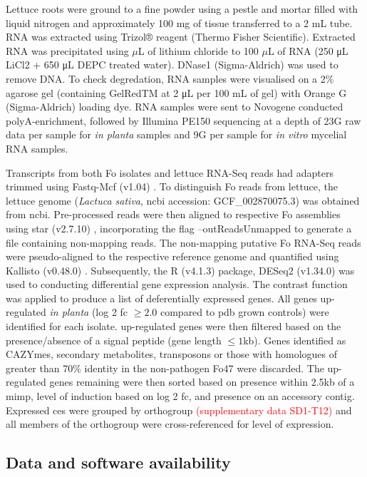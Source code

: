 Lettuce roots were ground to a fine powder using a pestle and mortar filled with liquid nitrogen and approximately 100 mg of tissue transferred to a 2 mL tube. RNA was extracted using Trizol® reagent (Thermo Fisher Scientific). Extracted RNA was precipitated using \(\mu\)L of lithium chloride to 100 \(\mu\)L of RNA (250 μL LiCl2 + 650 μL DEPC treated water). DNase1 (Sigma-Aldrich) was used to remove DNA. To check degredation, RNA samples were visualised on a 2\% agarose gel (containing GelRedTM at 2 μL per 100 mL of gel) with Orange G (Sigma-Aldrich) loading dye. RNA samples were sent to  Novogene conducted polyA-enrichment, followed by Illumina PE150 sequencing at a depth of 23G raw data per sample for \textit{in planta} samples and 9G per sample for \textit{in vitro} mycelial RNA samples.

Transcripts from both \ac{Fo} isolates and lettuce RNA-Seq reads had  adapters trimmed using Fastq-Mcf (v1.04) \parencite{Aronesty2013}. To distinguish \ac{Fo} reads from lettuce, the lettuce genome (\textit{Lactuca sativa}, \ac{ncbi} accession: GCF\_002870075.3) was obtained from \ac{ncbi}. Pre-processed reads were then aligned to respective \ac{Fo} assemblies using \ac{star} (v2.7.10) \parencite{Dobin2013}, incorporating the flag --outReadsUnmapped to generate a file containing non-mapping reads. The non-mapping putative \ac{Fo} RNA-Seq reads were pseudo-aligned to the respective reference genome and quantified using Kallisto (v0.48.0) \parencite{Bray2016}. Subsequently, the R (v4.1.3) \parencite{R} package, DESeq2 (v1.34.0) \parencite{Love2014} was used to conducting differential gene expression analysis. The contrast function was applied to produce a list of deferentially expressed genes. All genes up-regulated \textit{in planta} (log 2 \ac{fc} $\ge2.0$ compared to \ac{pdb} grown controls) were identified for each isolate. up-regulated genes were then filtered based on the presence/absence of a signal peptide (gene length $\le1$kb). Genes identified as CAZYmes, secondary metabolites, transposons or those with homologues of greater than 70\% identity in the non-pathogen Fo47 were discarded. The up-regulated genes remaining were then sorted based on presence within 2.5kb of a \ac{mimp}, level of induction based on log 2 \ac{fc}, and presence on an accessory contig. Expressed \acp{ce} were grouped by orthogroup \textcolor{red}{(supplementary data SD1-T12)} and all members of the orthogroup were cross-referenced for level of expression. 

\subsection{Data and software availability}


